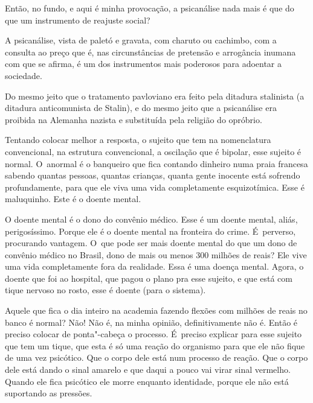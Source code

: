  

Então, no fundo, e aqui é minha provocação, a psicanálise nada mais é
que do que um instrumento de reajuste social?

 

A psicanálise, vista de paletó e gravata, com charuto ou cachimbo, com
a consulta ao preço que é, nas circunstâncias de pretensão e arrogância
inumana com que se afirma, é um dos instrumentos mais poderosos para
adoentar a sociedade.

 

Do mesmo jeito que o tratamento pavloviano era feito pela ditadura
stalinista (a ditadura anticomunista de Stalin), e do mesmo jeito que a
psicanálise era proibida na Alemanha nazista e substituída pela religião
do opróbrio.

 

Tentando colocar melhor a resposta, o sujeito que tem na nomenclatura
convencional, na estrutura convencional, a oscilação que é bipolar, esse
sujeito é normal. O~anormal é o banqueiro que fica contando dinheiro
numa praia francesa sabendo quantas pessoas, quantas crianças, quanta
gente inocente está sofrendo profundamente, para que ele viva uma vida
completamente esquizotímica. Esse é maluquinho. Este é o doente mental.

 

O doente mental é o dono do convênio médico. Esse é um doente mental,
aliás, perigosíssimo. Porque ele é o doente mental na fronteira do
crime. É~perverso, procurando vantagem. O~que pode ser mais doente
mental do que um dono de convênio médico no Brasil, dono de mais ou
menos 300 milhões de reais? Ele vive uma vida completamente fora da
realidade. Essa é uma doença mental. Agora, o doente que foi ao
hospital, que pagou o plano pra esse sujeito, e que está com tique
nervoso no rosto, esse é doente (para o sistema).

 

Aquele que fica o dia inteiro na academia fazendo flexões com milhões de
reais no banco é normal? Não! Não é, na minha opinião, definitivamente
não é. Então é preciso colocar de ponta"-cabeça o processo. É~preciso
explicar para esse sujeito que tem um tique, que esta é só uma reação do
organismo para que ele não fique de uma vez psicótico. Que o corpo dele
está num processo de reação. Que o corpo dele está dando o sinal amarelo
e que daqui a pouco vai virar sinal vermelho. Quando ele fica psicótico
ele morre enquanto identidade, porque ele não está suportando as
pressões.

